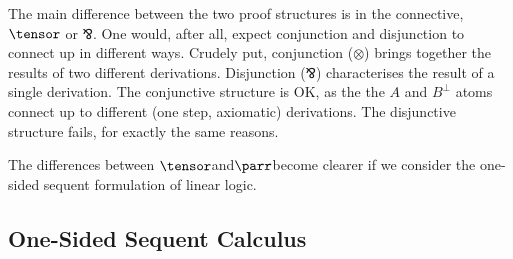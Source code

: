 The main difference between the two proof structures is in the connective,
$\tensor$ or $\invamp$.  One would, after all, expect conjunction and
disjunction to connect up in different ways.  Crudely put, conjunction
($\otimes$) brings together the results of two different derivations. 
Disjunction ($\invamp$) characterises the result of a single derivation.
The conjunctive structure is OK, as the the $A$ and $B^\bot$ atoms connect
up to different (one step, axiomatic) derivations.  The disjunctive structure
fails, for exactly the same reasons.

The differences between $\tensor$and$\parr$become clearer if we consider
the one-sided sequent formulation of linear logic.
 
\subsection{One-Sided Sequent Calculus}

